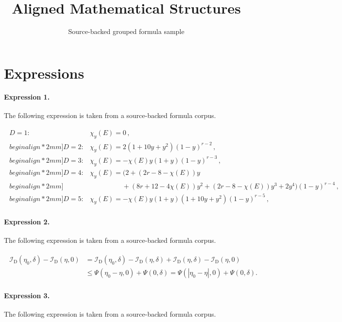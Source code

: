 \documentclass[11pt]{article}
\title{Aligned Mathematical Structures}
\author{Source-backed grouped formula sample}
\date{}
\begin{document}
\maketitle
\section{Expressions}
\paragraph{Expression 1.} The following expression is taken from a source-backed formula corpus.

\begin{align*}\begin{array}{ll}D=1:&\chi_y(E)=0\,,\\begin{align*}2mm]D=2:&\chi_y(E)=2(1+10y+y^2)(1-y)^{r-2}\,,\\begin{align*}2mm]D=3:&\chi_y(E)=-\chi(E)y(1+y)(1-y)^{r-3}\,,\\begin{align*}2mm]D=4:&\chi_y(E)=(2+(2r-8-\chi(E))y\\begin{align*}2mm]&\hspace{2cm}+(8r+12-4\chi(E))y^2+(2r-8-\chi(E))y^3+2y^4)(1-y)^{r-4}\,,\\begin{align*}2mm]D=5:&\chi_y(E)=-\chi(E)y(1+y)(1+10y+y^2)(1-y)^{r-5}\,,\end{array} \end{align*}

\paragraph{Expression 2.} The following expression is taken from a source-backed formula corpus.

\begin{align*}\begin{aligned}\mathcal{I}_{\mathrm{D} }(\eta_0, \delta ) - \mathcal{I}_{\mathrm{D} }(\eta, 0 ) & = \mathcal{I}_{\mathrm{D} }(\eta_0, \delta ) - \mathcal{I}_{\mathrm{D} }(\eta, \delta ) + \mathcal{I}_{\mathrm{D} }(\eta, \delta ) - \mathcal{I}_{\mathrm{D} }(\eta, 0 ) \\& \leq \Psi (\eta_0-\eta, 0 ) + \Psi (0, \delta ) = \Psi ( |\eta_0-\eta|, 0 ) + \Psi (0, \delta ).\end{aligned}\end{align*}

\paragraph{Expression 3.} The following expression is taken from a source-backed formula corpus.
\end{document}
